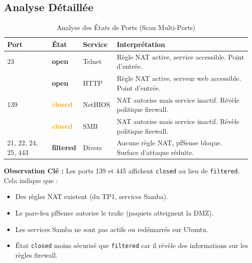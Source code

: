 \documentclass[12pt,a4paper,openany]{report}
\newcommand{\tableheadcolor}{\rowcolor{tableheadbg}}
\begin{document}
	\subsection{Analyse Détaillée}
	\begin{table}[H]
		\centering
		\small
		\renewcommand{\arraystretch}{1.5}
		\setlength{\arrayrulewidth}{0.5pt}
		\begin{tabular}{>{\centering\arraybackslash}p{1.8cm} >{\centering\arraybackslash}p{2.5cm} p{3cm} p{6.5cm}}
			\arrayrulecolor{tableborder}
			\hline
			\tableheadcolor
			\textcolor{tableheadfg}{\textbf{Port}} &
			\textcolor{tableheadfg}{\textbf{État}} &
			\textcolor{tableheadfg}{\textbf{Service}} &
			\textcolor{tableheadfg}{\textbf{Interprétation}} \\
			\hline
			\rowcolor{tablerowalt}
			23 & \textcolor{green!50!black}{\textbf{open}} & Telnet & Règle NAT active, service accessible. Point d'entrée. \\
			
			80 & \textcolor{green!50!black}{\textbf{open}} & HTTP & Règle NAT active, serveur web accessible. Point d'entrée. \\
			
			\rowcolor{tablerowalt}
			139 & \textcolor{orange}{\textbf{closed}} & NetBIOS & NAT autorise mais service inactif. Révèle politique firewall. \\
			
			445 & \textcolor{orange}{\textbf{closed}} & SMB & NAT autorise mais service inactif. Révèle politique firewall. \\
			
			\rowcolor{tablerowalt}
			21, 22, 24, 25, 443 & \textcolor{accent}{\textbf{filtered}} & Divers & Aucune règle NAT, pfSense bloque. Surface d'attaque réduite. \\
			\hline
		\end{tabular}
		\caption{Analyse des États de Ports (Scan Multi-Ports)}
	\end{table}
	
	\textbf{Observation Clé :} Les ports 139 et 445 affichent \texttt{closed} au lieu de \texttt{filtered}. Cela indique que :
	\begin{itemize}
		\item Des règles NAT existent (du TP1, services Samba).
		\item Le pare-feu pfSense autorise le trafic (paquets atteignent la DMZ).
		\item Les services Samba ne sont pas actifs ou redémarrés sur Ubuntu.
		\item État \texttt{closed} moins sécurisé que \texttt{filtered} car il révèle des informations sur les règles firewall.
	\end{itemize}
	
\end{document}
